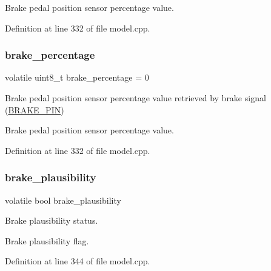 Brake pedal position sensor percentage value. 

Definition at line 332 of file model.\+cpp.

\mbox{\label{group___board__model__group_ga8e50a30864da7026531520887968d4c0}} 
\subsubsection{\texorpdfstring{brake\+\_\+percentage}{brake\_percentage}\hspace{0.1cm}{\footnotesize\ttfamily [2/2]}}
{\footnotesize\ttfamily volatile uint8\+\_\+t brake\+\_\+percentage = 0}



Brake pedal position sensor percentage value retrieved by brake signal (\mbox{\hyperlink{group___board__pinout__group_gad632b56bf4c6259a390c3db91607078e}{B\+R\+A\+K\+E\+\_\+\+P\+IN}}) 

Brake pedal position sensor percentage value. 

Definition at line 332 of file model.\+cpp.

\mbox{\label{group___board__model__group_gae505d69d6ac9d4e7e3c2268ca6cb20b3}} 
\subsubsection{\texorpdfstring{brake\+\_\+plausibility}{brake\_plausibility}\hspace{0.1cm}{\footnotesize\ttfamily [1/2]}}
{\footnotesize\ttfamily volatile bool brake\+\_\+plausibility}



Brake plausibility status. 

Brake plausibility flag. 

Definition at line 344 of file model.\+cpp.

\mbox{\label{group___board__model__group_ga6fcde78da6b331e3fb04abace1b4dd68}} 
